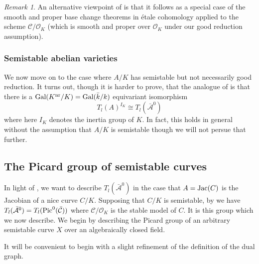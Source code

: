 \documentclass[12pt]{amsart}
\numberwithin{equation}{section}
\theoremstyle{remark}
\newtheorem{remark}[equation]{Remark}
\theoremstyle{definition}
\theoremstyle{definition}
\theoremstyle{definition}
\theoremstyle{definition}
\theoremstyle{definition}
\theoremstyle{definition}
\begin{document}
\begin{remark}
An alternative viewpoint of  is that it follows as a special case of the smooth and proper base change theorems in \'{e}tale cohomology applied to the scheme $\mathcal{C}/\mathcal{O}_K$ (which is smooth and proper over $\mathcal{O}_K$ under our good reduction assumption).
\end{remark}

\subsubsection{Semistable abelian varieties}

We now move on to the case where $A/K$ has semistable but not necessarily good reduction. It turns out, though it is harder to prove, that the analogue of  is that there is a $\textup{Gal}(K^\textup{nr}/K)=\textup{Gal}(\bar{k}/k)$ equivariant isomorphism
\begin{equation}\label{tate module red 2}
T_l(A)^{I_K}\cong T_l(\bar{\mathcal{A}}^0)
\end{equation}
where here $I_K$ denotes the inertia group of $K$. In fact, this holds in general without the assumption that $A/K$ is semistable though we will not persue that further.

\subsection{The Picard group of semistable curves}

In light of , we want to describe  $T_l(\bar{\mathcal{A}}^0)$ in the case that $A=\textup{Jac}(C)$ is the Jacobian of a nice curve $C/K$. Supposing that $C/K$ is semistable, by  we have $T_l(\bar{\mathcal{A}}^0)=T_l(\textup{Pic}^0(\bar{\mathcal{C}}))$ where $\mathcal{C}/\mathcal{O}_K$ is the stable model of $C$. It is this group which we now describe. We begin by describing the Picard group of an arbitrary  semistable curve $X$ over an algebraically closed field.

It will be convenient to begin with a slight refinement of the definition of the dual graph.
\end{document}
